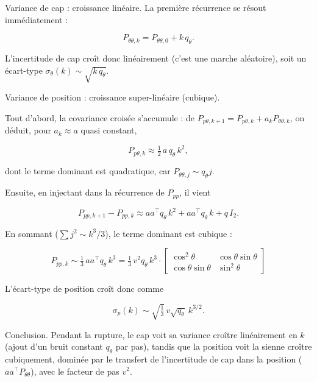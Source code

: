 \documentclass[11pt]{article}
\theoremstyle{remark}
\theoremstyle{definition}
\begin{document}
Variance de cap : croissance linéaire. La première récurrence se résout
immédiatement :

\begin{equation}
P_{\theta\theta,k} = P_{\theta\theta,0} + k\,q_\theta .
\end{equation}

L'incertitude de cap croît donc linéairement (c'est une marche aléatoire), soit un
écart-type $\sigma_\theta(k) \sim \sqrt{k\,q_\theta}$.

Variance de position : croissance super-linéaire (cubique).

Tout d'abord, la covariance croisée s'accumule : de
$P_{p\theta,k+1} = P_{p\theta,k} + a_k P_{\theta\theta,k}$, on déduit, pour $a_k \approx a$
quasi constant,

\begin{equation}
P_{p\theta,k} \approx \tfrac{1}{2}\,a\,q_\theta\,k^2,
\end{equation}

dont le terme dominant est quadratique, car $P_{\theta\theta,j} \sim q_\theta j$.

Ensuite, en injectant dans la récurrence de $P_{pp}$, il vient

\begin{equation}
P_{pp,k+1} - P_{pp,k} \approx a a^\top q_\theta\,k^2 + a a^\top q_\theta\,k + q\,I_2 .
\end{equation}

En sommant ($\sum j^2 \sim k^3/3$), le terme dominant est cubique :

\begin{equation}
\boxed{P_{pp,k} \sim \tfrac{1}{3}\,a a^\top q_\theta\,k^3 = \tfrac{1}{3}\,v^2 q_\theta\,k^3 \cdot \begin{bmatrix}\cos^2\theta & \cos\theta\sin\theta \\ \cos\theta\sin\theta & \sin^2\theta\end{bmatrix}}
\end{equation}

L'écart-type de position croît donc comme

\begin{equation}
\sigma_p(k) \sim \sqrt{\tfrac{1}{3}}\,v\sqrt{q_\theta}\ k^{3/2}.
\end{equation}

Conclusion. Pendant la rupture, le cap voit sa variance croître
linéairement en $k$ (ajout d'un bruit constant $q_\theta$ par pas), tandis que la
position voit la sienne croître cubiquement, dominée par le transfert de
l'incertitude de cap dans la position ($a a^\top P_{\theta\theta}$), avec le facteur de pas
$v^2$.
\end{document}
